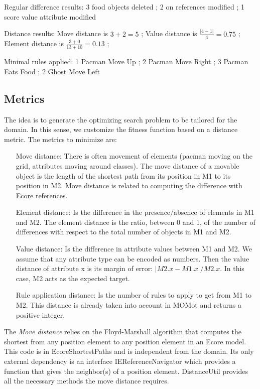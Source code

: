 Regular difference results:
3 food objects deleted ;
2 on references modified ;
1 score value attribute modified

Distance results:
Move distance is $3+2=5$ ;
Value distance is $\frac{|4-1|}{4}=0.75$ ;
Element distance is $\frac{3+0}{13+10}=0.13$ ;

Minimal rules applied:
1 Pacman Move Up ;
2 Pacman Move Right ;
3 Pacman Eats Food ;
2 Ghost Move Left

\subsection{Metrics}
The idea is to generate the optimizing search problem to be tailored for the domain. In this sense, we customize the fitness function based on a distance metric. The metrics to minimize are:
\begin{itemize}
	\item[Move distance:] There is often movement of elements (\eg pacman moving on the grid, attributes moving around classes). The move distance of a movable object is the length of the shortest path from its position in M1 to its position in M2. Move distance is related to computing the difference with Ecore references.
	\item[Element distance:] Is the difference in the presence/absence of elements in M1 and M2. The element distance is the ratio, between 0 and 1, of the number of differences with respect to the total number of objects in M1 and M2.
	\item[Value distance:] Is the difference in attribute values between M1 and M2. We assume that any attribute type can be encoded as numbers. Then the value distance of attribute x is its margin of error: $|M2.x - M1.x| / M2.x$. In this case, M2 acts as the expected target.
	\item[Rule application distance:] Is the number of rules to apply to get from M1 to M2. This distance is already taken into account in MOMot and returns a positive integer.
\end{itemize}

The \emph{Move distance} relies on the Floyd-Marshall algorithm that computes the shortest from any position element to any position element in an Ecore model. This code is in EcoreShortestPaths and is independent from the domain. Its only external dependency is an interface IEReferenceNavigator which provides a function that gives the neighbor(s) of a position element. DistanceUtil provides all the necessary methods the move distance requires.

